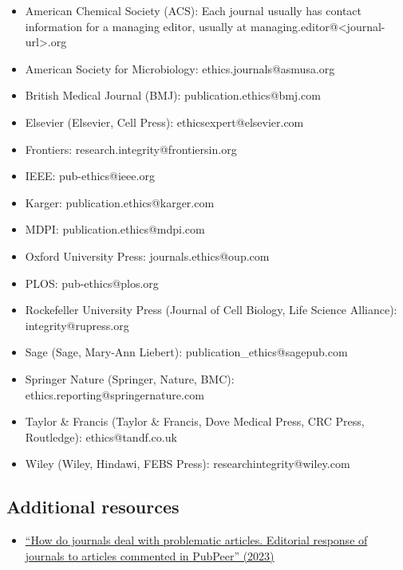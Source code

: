 \documentclass[letterpaper, 12pt]{article}
\begin{document}
\begin{itemize}
    \setlength\itemsep{-0.5em}
    \item American Chemical Society (ACS): Each journal usually has contact information for a managing editor, usually at managing.editor@<journal-url>.org
    \item American Society for Microbiology: ethics.journals@asmusa.org
    \item British Medical Journal (BMJ): publication.ethics@bmj.com
    \item Elsevier (Elsevier, Cell Press): ethicsexpert@elsevier.com
    \item Frontiers: research.integrity@frontiersin.org
    \item IEEE: pub-ethics@ieee.org
    \item Karger: publication.ethics@karger.com
    \item MDPI: publication.ethics@mdpi.com
    \item Oxford University Press: journals.ethics@oup.com
    \item PLOS: pub-ethics@plos.org
    \item Rockefeller University Press (Journal of Cell Biology, Life Science Alliance): integrity@rupress.org
    \item Sage (Sage, Mary-Ann Liebert): publication\_ethics@sagepub.com
    \item Springer Nature (Springer, Nature, BMC): ethics.reporting@springernature.com
    \item Taylor \& Francis (Taylor \& Francis, Dove Medical Press, CRC Press, Routledge): ethics@tandf.co.uk
    \item Wiley (Wiley, Hindawi, FEBS Press): researchintegrity@wiley.com
\end{itemize}

\subsection*{Additional resources}

\begin{itemize}
    \setlength\itemsep{-0.5em}
    \item \href{https://doi.org/10.3145/epi.2023.ene.18}{``How do journals deal with problematic articles. Editorial response of journals to articles commented in PubPeer'' (2023)}
\end{itemize}
\end{document}
